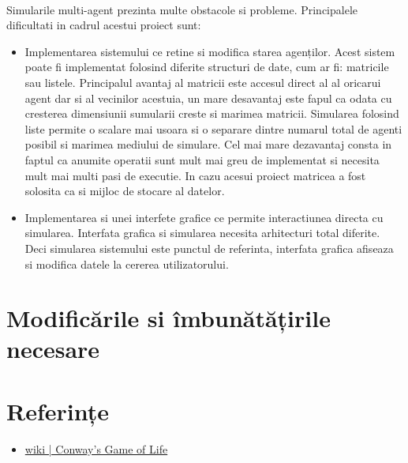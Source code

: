 \documentclass[11pt ,A4]{article}
\begin{document}
        \paragraph{} Simularile multi-agent prezinta multe obstacole si probleme. Principalele dificultati in cadrul acestui proiect sunt:
        \begin{itemize}
            \item Implementarea sistemului ce retine si modifica starea agenților.
            Acest sistem poate fi implementat folosind diferite structuri de date, cum ar fi: matricile sau listele.
            Principalul avantaj al matricii este accesul direct al al oricarui agent dar si al vecinilor acestuia, un mare desavantaj este fapul ca odata cu cresterea dimensiunii sumularii creste si marimea matricii.
            Simularea folosind liste permite o scalare mai usoara si o separare dintre numarul total de agenti posibil si marimea mediului de simulare.
            Cel mai mare dezavantaj consta in faptul ca anumite operatii sunt mult mai greu de implementat si necesita mult mai multi pasi de executie.
            In cazu acesui proiect matricea a fost solosita ca si mijloc de stocare al datelor.

            \item Implementarea si unei interfete grafice ce permite interactiunea directa cu simularea. Interfata grafica si simularea necesita arhitecturi total diferite. Deci simularea sistemului este punctul de referinta, interfata grafica afiseaza si modifica datele la cererea utilizatorului.
        \end{itemize}

    \section{Modificările si îmbunătățirile necesare}

    \section{Referințe}

        \begin{itemize}
            \item \href{https://en.wikipedia.org/wiki/Conway%27s_Game_of_Life}{wiki | Conway's Game of Life}
        \end{itemize}
\end{document}
